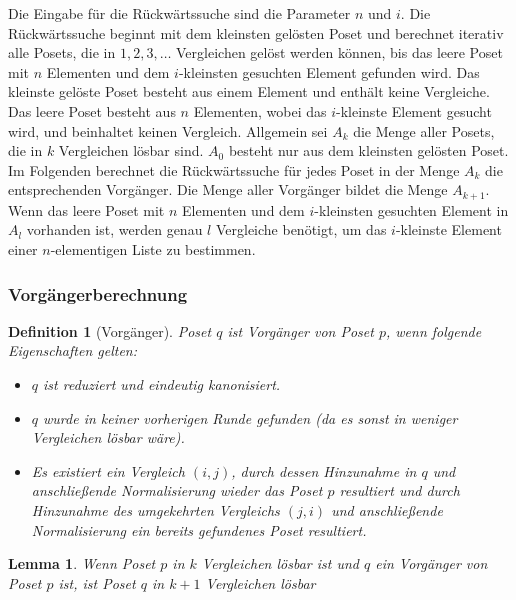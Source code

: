 \documentclass[10pt,journal,compsoc]{IEEEtran}
\newtheorem{lemma}{Lemma}
\newtheorem{definition}{Definition}
\begin{document}
Die Eingabe für die Rückwärtssuche sind die Parameter $n$ und $i$.
Die Rückwärtssuche beginnt mit dem kleinsten gelösten Poset und berechnet iterativ alle Posets, die in $1, 2, 3, \dots$ Vergleichen gelöst werden können, bis das leere Poset mit $n$ Elementen und dem $i$-kleinsten gesuchten Element gefunden wird.
Das kleinste gelöste Poset besteht aus einem Element und enthält keine Vergleiche.
Das leere Poset besteht aus $n$ Elementen, wobei das $i$-kleinste Element gesucht wird, und beinhaltet keinen Vergleich.
Allgemein sei $A_k$ die Menge aller Posets, die in $k$ Vergleichen lösbar sind.
$A_0$ besteht nur aus dem kleinsten gelösten Poset.
Im Folgenden berechnet die Rückwärtssuche für jedes Poset in der Menge $A_k$ die entsprechenden Vorgänger.
Die Menge aller Vorgänger bildet die Menge $A_{k + 1}$.
Wenn das leere Poset mit $n$ Elementen und dem $i$-kleinsten gesuchten Element in $A_l$ vorhanden ist, werden genau $l$ Vergleiche benötigt, um das $i$-kleinste Element einer $n$-elementigen Liste zu bestimmen.

\subsubsection{Vorgängerberechnung} \label{sec:backward:predecessor_calculation}

\begin{definition}[Vorgänger] \label{definition:predecessor_calculation}
  Poset $q$ ist Vorgänger von Poset $p$, wenn folgende Eigenschaften gelten:
  \begin{itemize}
    \item $q$ ist reduziert und eindeutig kanonisiert.
    \item $q$ wurde in keiner vorherigen Runde gefunden (da es sonst in weniger Vergleichen lösbar wäre).
    \item Es existiert ein Vergleich $(i, j)$, durch dessen Hinzunahme in $q$ und anschließende Normalisierung wieder das Poset $p$ resultiert und durch Hinzunahme des umgekehrten Vergleichs $(j, i)$ und anschließende Normalisierung ein bereits gefundenes Poset resultiert.
  \end{itemize}
\end{definition}

\begin{lemma} \label{lemma:predecessor_calculation}
  Wenn Poset $p$ in $k$ Vergleichen lösbar ist und $q$ ein Vorgänger von Poset $p$ ist, ist Poset $q$ in $k + 1$ Vergleichen lösbar
\end{lemma}
\end{document}
